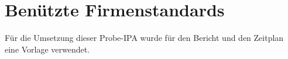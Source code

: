 \chapter{Benützte Firmenstandards}\label{ch:benuetzte-firmenstandards}

Für die Umsetzung dieser Probe-IPA wurde für den Bericht und den Zeitplan eine Vorlage verwendet.
